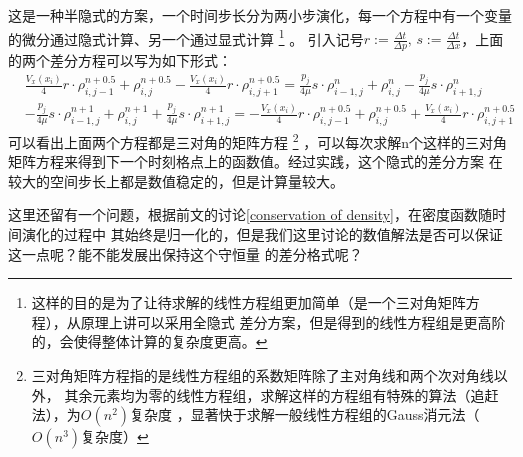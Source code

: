     这是一种半隐式的方案，一个时间步长分为两小步演化，每一个方程中有一个变量的微分通过隐式计算、另一个通过显式计算
    \footnote{
        这样的目的是为了让待求解的线性方程组更加简单（是一个三对角矩阵方程），从原理上讲可以采用全隐式
        差分方案，但是得到的线性方程组是更高阶的，会使得整体计算的复杂度更高。
    }
    。
    引入记号$r:=\frac{\Delta t}{\Delta p},\, s:=\frac{\Delta t}{\Delta x}$，上面的两个差分方程可以写为如下形式：
    \begin{equation}
        \begin{split}
            &\frac{V_{x}(x_{i})}{4}r\cdot\rho_{i,j-1}^{n+0.5} + \rho_{i,j}^{n+0.5} - \frac{V_{x}(x_{i})}{4}r\cdot\rho_{i,j+1}^{n+0.5} =
             \frac{p_{j}}{4\mu}s\cdot\rho_{i-1,j}^{n} + \rho_{i,j}^{n} - \frac{p_{j}}{4\mu}s\cdot\rho_{i+1,j}^{n} \\
            &- \frac{p_{j}}{4\mu}s\cdot\rho_{i-1,j}^{n+1} + \rho_{i,j}^{n+1} + \frac{p_{j}}{4\mu}s\cdot\rho_{i+1,j}^{n+1} =
            -\frac{V_{x}(x_{i})}{4}r\cdot\rho_{i,j-1}^{n+0.5} + \rho_{i,j}^{n+0.5} + \frac{V_{x}(x_{i})}{4}r\cdot\rho_{i,j+1}^{n+0.5}
        \end{split}
    \end{equation}
    可以看出上面两个方程都是三对角的矩阵方程
    \footnote{
        三对角矩阵方程指的是线性方程组的系数矩阵除了主对角线和两个次对角线以外，
        其余元素均为零的线性方程组，求解这样的方程组有特殊的算法（追赶法），为$O(n^2)$复杂度
        ，显著快于求解一般线性方程组的Gauss消元法（$O(n^3)$复杂度）
    }
    ，可以每次求解n个这样的三对角矩阵方程来得到下一个时刻格点上的函数值。经过实践，这个隐式的差分方案
    在较大的空间步长上都是数值稳定的，但是计算量较大。
    \par 
    这里还留有一个问题，根据前文的讨论\ref{conservation of density}，在密度函数随时间演化的过程中
    其始终是归一化的，但是我们这里讨论的数值解法是否可以保证这一点呢？能不能发展出保持这个守恒量
    的差分格式呢？

